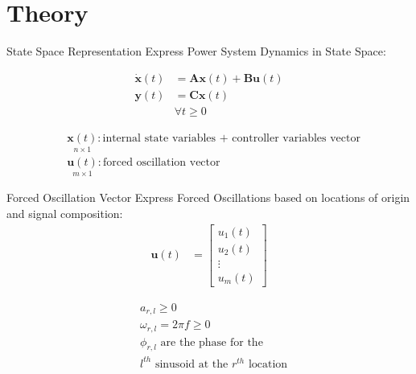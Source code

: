 \section[Theory]{Theory}
\label{sec:lasso_theory}

\begin{frame}[fragile]{State Space Representation}
	Express Power System Dynamics in State Space:

	\begin{align*}
		\dot{\textbf{x}}(t) &= 
		\textbf{A}\textbf{x}(t)
		+ \textbf{B}\textbf{u}(t)\\
		\textbf{y}(t) &= 
		\textbf{C}\textbf{x}(t)\\  
		& \forall t\geq0	
	\end{align*}
	
	\begin{align*}
		& \underset{\scriptscriptstyle n\times 1}{\textbf{x}(t)} : \text{internal state variables + controller variables vector}                                                                      \\
		& \underset{\scriptscriptstyle m\times 1}{\textbf{u}(t)} : \text{forced oscillation vector}
	\end{align*}
\end{frame}

\begin{frame}[fragile]{Forced Oscillation Vector}
	Express Forced Oscillations based on locations of origin and signal composition:
	\begin{align*}
		\textbf{u}(t) &= 
		\begin{bmatrix}
			u_1(t) \\
			u_2(t) \\
			\vdots \\
			u_m(t)
		\end{bmatrix}		
	\end{align*}
	
	\begin{align*}
		& a_{r,l} \geq0 \\
		& \omega_{r,l} = 2\pi f \geq 0 \\
		& \phi_{r,l} \text{ are the phase for the} \\
		& l^{th} \text{ sinusoid at the }  r^{th} \text{ location}
	\end{align*}

\end{frame}